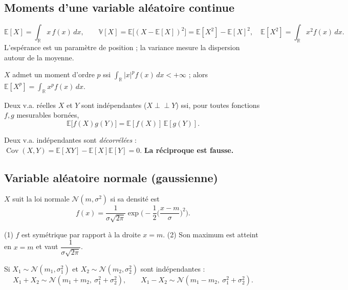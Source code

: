 \documentclass[11pt,a4paper]{article}
\newcommand{\E}{\mathbb{E}}
\newcommand{\V}{\mathbb{V}}
\newcommand{\R}{\mathbb{R}}
\newcommand{\Cov}{\operatorname{Cov}}
\newcommand{\1}{\mathbf{1}}
\begin{document}
\subsection{Moments d'une variable aléatoire continue}

\begin{definition}
\[
\E[X]=\int_{\R}x\,f(x)\,dx,\qquad
\V[X]=\E\big[(X-\E[X])^2\big]=\E[X^2]-\E[X]^2,\quad \E[X^2]=\int_{\R}x^2f(x)\,dx.
\]
L'espérance est un paramètre de position ; la variance mesure la dispersion autour de la moyenne.
\end{definition}

\begin{definition}
$X$ admet un moment d'ordre $p$ ssi $\int_{\R}|x|^pf(x)\,dx<+\infty$ ; alors $\E[X^p]=\int_{\R}x^pf(x)\,dx$.
\end{definition}

\begin{definition}[Indépendance]
Deux v.a. réelles $X$ et $Y$ sont indépendantes ($X\perp\!\!\!\perp Y$) ssi, pour toutes fonctions $f,g$ mesurables bornées,
\[
\E\big[f(X)g(Y)\big]=\E[f(X)]\,\E[g(Y)].
\]
\end{definition}

\begin{remarque}
Deux v.a. indépendantes sont \emph{décorrélées} : $\Cov(X,Y)=\E[XY]-\E[X]\E[Y]=0$. \textbf{La réciproque est fausse.}
\end{remarque}

\subsection{Variable aléatoire normale (gaussienne)}

\begin{definition}
$X$ suit la loi normale $\mathcal{N}(m,\sigma^2)$ si sa densité est
\[
f(x)=\frac{1}{\sigma\sqrt{2\pi}}\exp\!\Big(-\frac12\Big(\frac{x-m}{\sigma}\Big)^{2}\Big).
\]
\end{definition}

\begin{remarque}
(1) $f$ est symétrique par rapport à la droite $x=m$.
(2) Son maximum est atteint en $x=m$ et vaut $\dfrac{1}{\sigma\sqrt{2\pi}}$.
\end{remarque}

\begin{proposition}[Stabilité]
Si $X_1\sim\mathcal{N}(m_1,\sigma_1^2)$ et $X_2\sim\mathcal{N}(m_2,\sigma_2^2)$ sont indépendantes :
\[
X_1+X_2\sim\mathcal{N}(m_1+m_2,\ \sigma_1^2+\sigma_2^2),\qquad
X_1-X_2\sim\mathcal{N}(m_1-m_2,\ \sigma_1^2+\sigma_2^2).
\]
\end{proposition}
\end{document}
